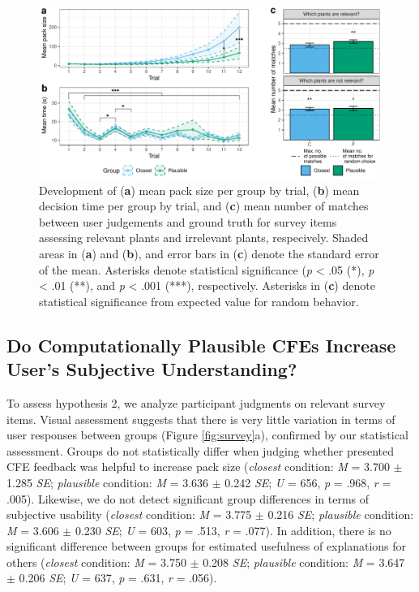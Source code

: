 \begin{figure}
   \centering
   \includegraphics[width=\textwidth]{./media/H1_p_ShubsPerTrial_RTPertrial_PAZ_FINAL.pdf}
   \caption{Development of (\textbf{a}) mean pack size per group by trial, (\textbf{b}) mean decision time per group by trial, and (\textbf{c}) mean number of matches between user judgements and ground truth for survey items assessing relevant plants and irrelevant plants, respecively. Shaded areas in (\textbf{a}) and (\textbf{b}), and error bars in (\textbf{c}) denote the standard error of the mean. Asterisks denote statistical significance (\textit{p} < .05 (*), \textit{p} < .01 (**), and \textit{p} < .001 (***), respectively. Asterisks in (\textbf{c}) denote statistical significance from expected value for random behavior.}
   \label{fig:hyp1}
 \end{figure}

\subsection{Do Computationally Plausible CFEs Increase User's Subjective Understanding?}
To assess hypothesis 2, we analyze participant judgments on relevant survey items.
Visual assessment suggests that there is very little variation in terms of user responses between groups (Figure \ref{fig:survey}a), confirmed by our statistical assessment. 
Groups do not statistically differ when judging whether presented \gls{CFE} feedback was helpful to increase pack size (\textit{closest} condition: \textit{M} = 3.700 $\pm$ 1.285 \textit{SE}; \textit{plausible} condition: \textit{M} = 3.636 $\pm$ 0.242 \textit{SE}; \textit{U} = 656, \textit{p} = .968, \textit{r} = .005).
Likewise, we do not detect significant group differences in terms of subjective usability (\textit{closest} condition: \textit{M} = 3.775 $\pm$ 0.216 \textit{SE}; \textit{plausible} condition: \textit{M} = 3.606 $\pm$ 0.230 \textit{SE}; \textit{U} = 603, \textit{p} = .513, \textit{r} = .077).
In addition, there is no significant difference between groups for estimated usefulness of explanations for others (\textit{closest} condition: \textit{M} = 3.750 $\pm$ 0.208 \textit{SE}; \textit{plausible} condition: \textit{M} = 3.647 $\pm$ 0.206 \textit{SE}; \textit{U} = 637, \textit{p} = .631, \textit{r} = .056).

